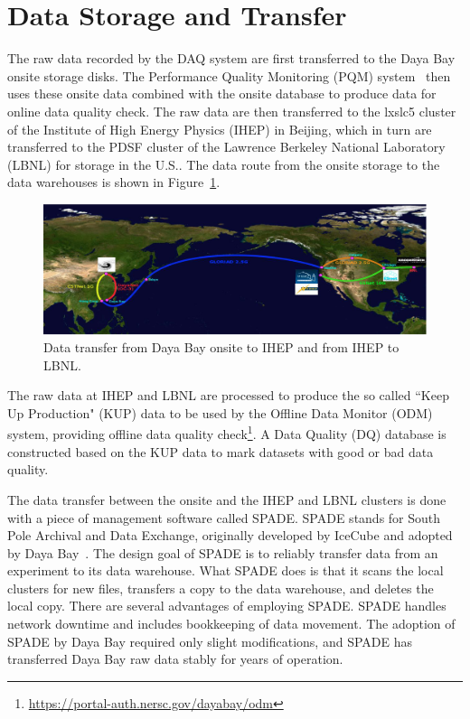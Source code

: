 \section{Data Storage and Transfer}
The raw data recorded by the DAQ system are first transferred to the Daya Bay onsite storage disks. The Performance Quality Monitoring (PQM) system~\cite{Liu2013} then uses these onsite data combined with the onsite database to produce data for online data quality check. The raw data are then transferred to the lxslc5 cluster of the Institute of High Energy Physics (IHEP) in Beijing, which in turn are transferred to the PDSF cluster of the Lawrence Berkeley National Laboratory (LBNL) for storage in the U.S.. The data route from the onsite storage to the data warehouses is shown in Figure~\ref{fig:data_transfer}.
\begin{figure}
	\includegraphics[width=\textwidth]{figures/chap4/data_transfer.eps}
	\caption{Data transfer from Daya Bay onsite to IHEP and from IHEP to LBNL.}
	\label{fig:data_transfer}
\end{figure}
The raw data at IHEP and LBNL are processed to produce the so called ``Keep Up Production" (KUP) data to be used by the Offline Data Monitor (ODM) system, providing offline data quality check\footnote{\href{https://portal-auth.nersc.gov/dayabay/odm}{https://portal-auth.nersc.gov/dayabay/odm}}. A Data Quality (DQ) database is constructed based on the KUP data to mark datasets with good or bad data quality.

The data transfer between the onsite and the IHEP and LBNL clusters is done with a piece of management software called SPADE. SPADE stands for South Pole Archival and Data Exchange, originally developed by IceCube and adopted by Daya Bay~\cite{docdb2696}. The design goal of SPADE is to reliably transfer data from an experiment to its data warehouse. What SPADE does is that it scans the local clusters for new files, transfers a copy to the data warehouse, and deletes the local copy. There are several advantages of employing SPADE. SPADE handles network downtime and includes bookkeeping of data movement. The adoption of SPADE by Daya Bay required only slight modifications, and SPADE has transferred Daya Bay raw data stably for years of operation.


